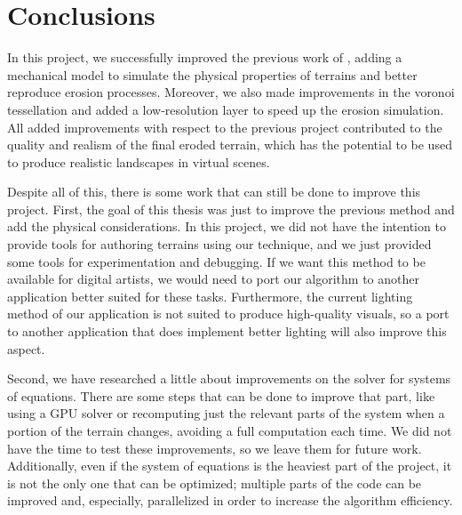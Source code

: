 

\chapter{Conclusions}

In this project, we successfully improved the previous work of 
\cite{10.2312:ceig.20241139}, adding a mechanical model to simulate 
the physical properties of terrains and better reproduce erosion 
processes. Moreover, we also made improvements in the voronoi tessellation and 
added a low-resolution layer to speed up the erosion simulation. 
All added improvements with respect to the previous project contributed 
to the quality and realism of the final eroded terrain, which 
has the potential to be used to produce realistic landscapes in virtual 
scenes. 

\vspace{10pt}

Despite all of this, there is some work that can still be done to improve 
this project. First, the goal of this thesis was just to improve 
the previous method and add the physical considerations. In this 
project, we did not have the intention to provide tools for authoring 
terrains using our technique, and we just provided some tools for 
experimentation and debugging. If we want this method to be available for 
digital artists, we would need to port our algorithm to another application 
better suited for these tasks. Furthermore, the current lighting 
method of our application is not suited to produce high-quality 
visuals, so a port to another application that does implement 
better lighting will also improve this aspect.

\vspace{10pt}

Second, we have researched a little about improvements on the solver 
for systems of equations. There are some steps that can be done to improve 
that part, like using a GPU solver or recomputing just the relevant 
parts of the system when a portion of the terrain changes, avoiding a 
full computation each time. We did not have the time to test these improvements, 
so we leave them for future work. Additionally, even if the system of 
equations is the heaviest part of the project, it is not the only one 
that can be optimized; multiple parts of the code can be improved and, 
especially, parallelized in order to increase the algorithm efficiency.

\vspace{10pt}

